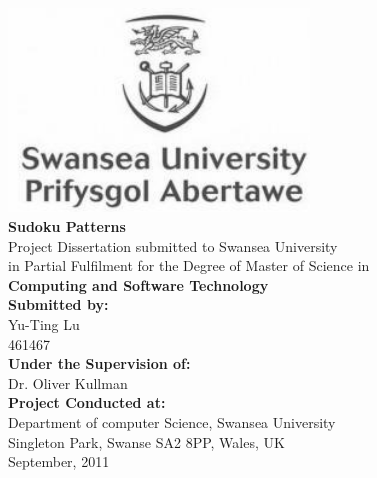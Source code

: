 \documentclass[11pt]{report}
\begin{document}
\begin{titlepage}
\centering
\includegraphics[width=0.6\textwidth]{./logo.jpg}\\ \vspace{50pt}
\Large \textbf{Sudoku Patterns}\\ \vspace{20pt}
Project Dissertation submitted to Swansea University\\ \vspace{6pt}
in Partial Fulfilment for the Degree of Master of Science  in\\ \vspace{12pt}
 \textbf{Computing and Software Technology}\\ \vspace{30pt}
\large \textbf{Submitted by:}\\ \vspace{6pt}
Yu-Ting Lu\\ \vspace{6pt}
461467 \\ \vspace{30pt}
\textbf{Under the Supervision of:}\\ \vspace{6pt}
Dr. Oliver Kullman\\ \vspace{30pt}
\textbf{Project Conducted at:}\\ \vspace{6pt}
Department of computer Science, Swansea University\\ \vspace{6pt}
Singleton Park, Swanse SA2 8PP, Wales, UK\\ \vspace{6pt}
September, 2011\\ \vspace{12pt}
\end{titlepage}
\end{document}
